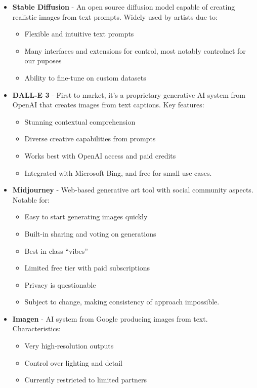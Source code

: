 \begin{itemize}
\item \textbf{Stable Diffusion} - An open source diffusion model capable of creating realistic images from text prompts. Widely used by artists due to:
\begin{itemize}
\item Flexible and intuitive text prompts
\item Many interfaces and extensions for control, most notably controlnet for our puposes
\item Ability to fine-tune on custom datasets
\end{itemize}

\item \textbf{DALL-E 3} - First to market, it's a proprietary generative AI system from OpenAI that creates images from text captions. Key features:
\begin{itemize}
\item Stunning contextual comprehension
\item Diverse creative capabilities from prompts
\item Works best with OpenAI access and paid credits
\item Integrated with Microsoft Bing, and free for small use cases.
\end{itemize}

\item \textbf{Midjourney} - Web-based generative art tool with social community aspects. Notable for:

\begin{itemize}
\item Easy to start generating images quickly
\item Built-in sharing and voting on generations
\item Best in class ``vibes''
\item Limited free tier with paid subscriptions
\item Privacy is questionable
\item Subject to change, making consistency of approach impossible.
\end{itemize}

\item \textbf{Imagen} - AI system from Google producing images from text. Characteristics:
\begin{itemize}
\item Very high-resolution outputs
\item Control over lighting and detail
\item Currently restricted to limited partners
\end{itemize}

\end{itemize}

